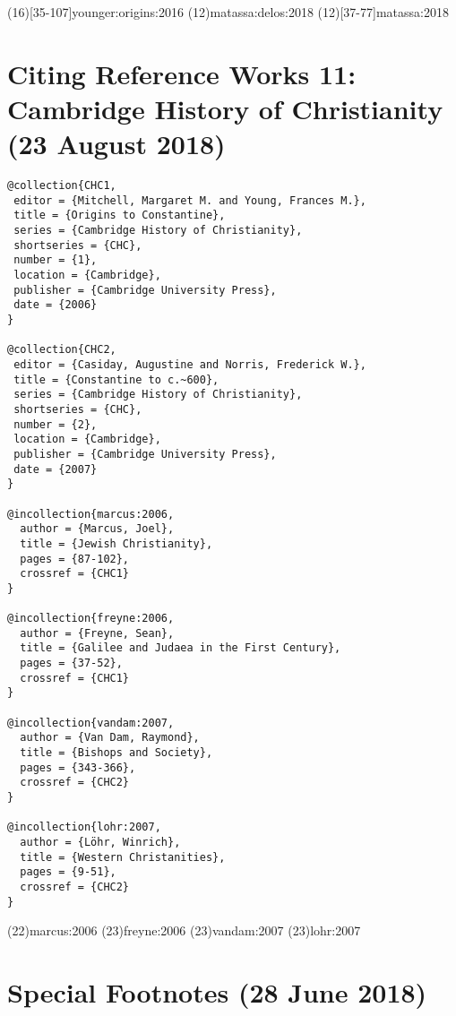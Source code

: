 \documentclass[a4paper]{article}
\begin{document}
\examplecite(16)[35-107]{younger:origins:2016}
\examplecite(12){matassa:delos:2018}
\citereset
\examplecite(12)[37-77]{matassa:2018}
\exampleabbreviations
\examplebibliography
{}

\section{Citing Reference Works 11: Cambridge History of Christianity (23 August 2018)}

\begin{verbatim}
@collection{CHC1,
 editor = {Mitchell, Margaret M. and Young, Frances M.},
 title = {Origins to Constantine},
 series = {Cambridge History of Christianity},
 shortseries = {CHC},
 number = {1},
 location = {Cambridge},
 publisher = {Cambridge University Press},
 date = {2006}
}

@collection{CHC2,
 editor = {Casiday, Augustine and Norris, Frederick W.},
 title = {Constantine to c.~600},
 series = {Cambridge History of Christianity},
 shortseries = {CHC},
 number = {2},
 location = {Cambridge},
 publisher = {Cambridge University Press},
 date = {2007}
}

@incollection{marcus:2006,
  author = {Marcus, Joel},
  title = {Jewish Christianity},
  pages = {87-102},
  crossref = {CHC1}
}

@incollection{freyne:2006,
  author = {Freyne, Sean},
  title = {Galilee and Judaea in the First Century},
  pages = {37-52},
  crossref = {CHC1}
}

@incollection{vandam:2007,
  author = {Van Dam, Raymond},
  title = {Bishops and Society},
  pages = {343-366},
  crossref = {CHC2}
}

@incollection{lohr:2007,
  author = {Löhr, Winrich},
  title = {Western Christanities},
  pages = {9-51},
  crossref = {CHC2}
}
\end{verbatim}

\examplecite(22){marcus:2006}
\examplecite(23){freyne:2006}
\examplecite(23){vandam:2007}
\examplecite(23){lohr:2007}
\exampleabbreviations
\examplebibliography
{}

\section{Special Footnotes (28 June 2018)}
\end{document}
